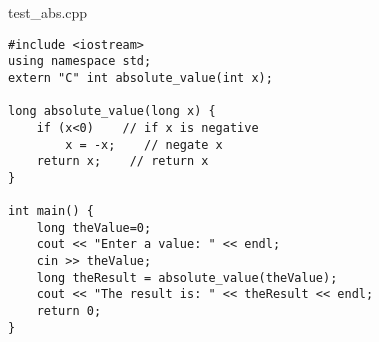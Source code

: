 \begin{frame}[fragile,label=absValue]{test\_abs.cpp}
\lstset{
    language=C++
}
\begin{lstlisting}
#include <iostream>
using namespace std;
extern "C" int absolute_value(int x);

long absolute_value(long x) {
    if (x<0)    // if x is negative
        x = -x;    // negate x
    return x;    // return x
}

int main() {
    long theValue=0;
    cout << "Enter a value: " << endl;
    cin >> theValue;
    long theResult = absolute_value(theValue);
    cout << "The result is: " << theResult << endl;
    return 0;
}
\end{lstlisting}
\end{frame}
